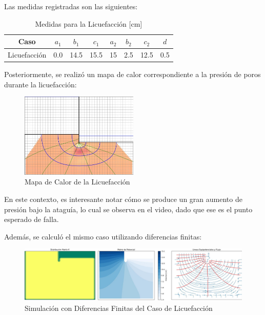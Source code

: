 \begin{center}
\end{center}

Las medidas registradas son las siguientes:

\begin{table}[H]
    \centering
    \caption{Medidas para la Licuefacción [cm]}
    \begin{tabular}{|c|c|c|c|c|c|c|c|}
    \hline
    Caso & $a_1$ & $b_1$ & $c_1$ & $a_2$ & $b_2$ & $c_2$ & $d$ \\ \hline
    Licuefacción & 0.0 & 14.5 & 15.5 & 15 & 2.5 & 12.5 & 0.5 \\ \hline
    \end{tabular}
    \label{tab:medidas1}
\end{table}

Posteriormente, se realizó un mapa de calor correspondiente a la presión de poros durante la licuefacción:

\begin{figure}[H]
    \centering
    \includegraphics[width=0.5\textwidth]{GRAFICOS/caso_licuefaccion_presion_poros.jpg}
    \caption{Mapa de Calor de la Licuefacción}
    \label{fig:maqueta_licuefaccion}
\end{figure}

En este contexto, es interesante notar cómo se produce un gran aumento de presión bajo la ataguía, lo cual se observa en el video, dado que ese es el punto esperado de falla.

Además, se calculó el mismo caso utilizando diferencias finitas:

\begin{figure}[H]
    \centering
    \includegraphics[width=1\textwidth]{GRAFICOS/laplace_caso_licuefaccion_escala_cm.jpg}
    \caption{Simulación con Diferencias Finitas del Caso de Licuefacción}
    \label{fig:maqueta_licuefaccion_diferencias_finitas}
\end{figure}

